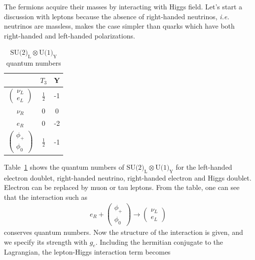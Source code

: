 The fermions acquire their masses by interacting with Higgs field. 
Let's start a discussion with leptons because the absence of right-handed neutrinos, 
\textit{i.e.} neutrinos are massless, makes the case simpler than quarks which 
have both right-handed and left-handed polarizations. 
\begin{table}[htb] 
\centering
\begin{tabular}{c c c}
\hline 
      & $T_3$ & Y \\
\hline \hline 
$\left(  \begin{array}{c} \nu_L \\ e_L \end{array} \right)$      & $\displaystyle  \frac{1}{2} $ & -1 \\
$ \nu_{R}$                                                      & 0 & 0 \\
$ e_R$                                                           & 0 & -2 \\
$\left(  \begin{array}{c} \phi_+  \\ \phi_0 \end{array} \right)$      & $\displaystyle  \frac{1}{2} $ & -1 \\
\hline 
\end{tabular}
\label{tab:su2Qnum}
\caption{$\textrm{SU(2)}_\textrm{L} \otimes \textrm{U(1)}_\textrm{Y}$ quantum numbers}
\end{table}
Table~\ref{tab:su2Qnum} shows the quantum numbers of  
$\textrm{SU(2)}_\textrm{L} \otimes \textrm{U(1)}_\textrm{Y}$
for the left-handed electron doublet, right-handed neutrino, right-handed electron and 
Higgs doublet. Electron can be replaced by muon or tau leptons. 
From the table, one can see that the interaction such as 
\begin{eqnarray} 
e_R + \left(  \begin{array}{c} \phi_+  \\ \phi_0 \end{array} \right) 
\rightarrow 
\left(  \begin{array}{c} \nu_L \\ e_L \end{array} \right)
\end{eqnarray} 
conserves quantum numbers. Now the structure of the interaction is given, and
we specify its strength with $g_e$. Including the hermitian conjugate 
to the Lagrangian, the lepton-Higgs interaction term becomes 
